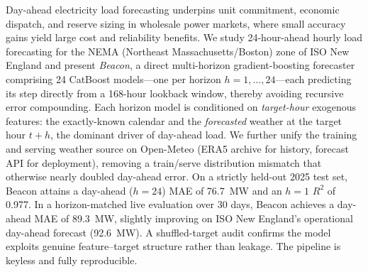 Day-ahead electricity load forecasting underpins unit commitment, economic
dispatch, and reserve sizing in wholesale power markets, where small accuracy
gains yield large cost and reliability benefits. We study 24-hour-ahead hourly
load forecasting for the NEMA (Northeast Massachusetts/Boston) zone of ISO New
England and present \emph{Beacon}, a direct multi-horizon gradient-boosting
forecaster comprising 24 CatBoost models---one per horizon $h=1,\dots,24$---each
predicting its step directly from a 168-hour lookback window, thereby avoiding
recursive error compounding. Each horizon model is conditioned on
\emph{target-hour} exogenous features: the exactly-known calendar and the
\emph{forecasted} weather at the target hour $t{+}h$, the dominant driver of
day-ahead load. We further unify the training and serving weather source on
Open-Meteo (ERA5 archive for history, forecast API for deployment), removing a
train/serve distribution mismatch that otherwise nearly doubled day-ahead error.
On a strictly held-out 2025 test set, Beacon attains a day-ahead ($h{=}24$) MAE
of 76.7~MW and an $h{=}1$ $R^2$ of 0.977. In a horizon-matched live evaluation
over 30 days, Beacon achieves a day-ahead MAE of 89.3~MW, slightly improving on
ISO New England's operational day-ahead forecast (92.6~MW). A shuffled-target
audit confirms the model exploits genuine feature--target structure rather than
leakage. The pipeline is keyless and fully reproducible.
